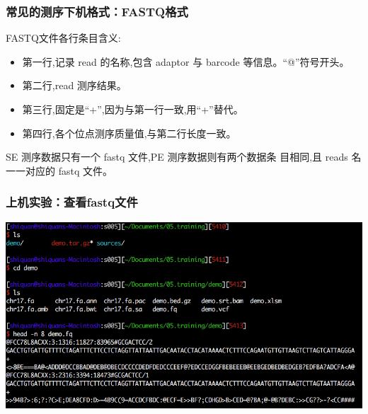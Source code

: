 \documentclass[12pt]{beamer}
\begin{document}
\begin{frame}\frametitle{常见的测序下机格式：FASTQ格式}
FASTQ文件各行条目含义:
\begin{itemize}
  \item 第一行,记录 read 的名称,包含 adaptor 与 barcode 等信息。“@”符号开头。
  \item 第二行,read 测序结果。
  \item 第三行,固定是“+”,因为与第一行一致,用“+”替代。
  \item 第四行,各个位点测序质量值,与第二行长度一致。
\end{itemize}




\begin{tcolorbox}[colback=backg!5,colframe=backg,title=SE与PE下机数据文件的区别]
  SE 测序数据只有一个 fastq 文件,PE 测序数据则有两个数据条 目相同,且 reads 名一一对应的 fastq 文件。
\end{tcolorbox}

\end{frame}

\begin{frame}\frametitle{上机实验：查看fastq文件}
  \includegraphics[width=\textwidth]{figures/fastq_com.png}
\end{frame}
\end{document}
